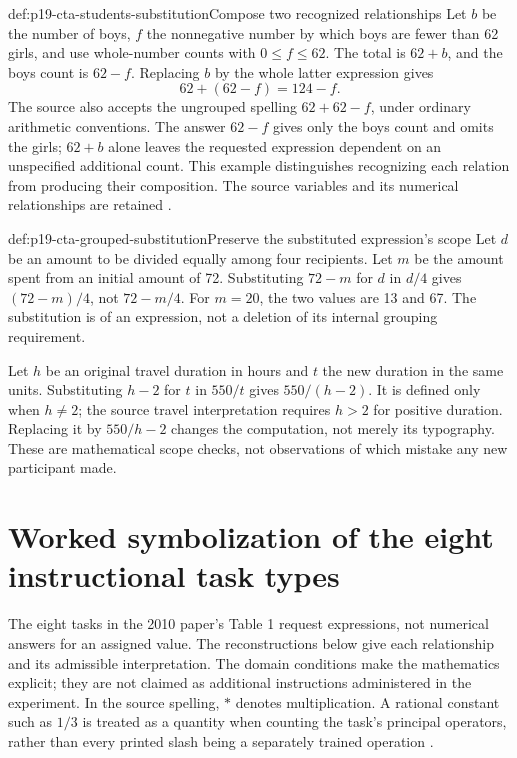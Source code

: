 \begin{hbexample}{def:p19-cta-students-substitution}{Compose two recognized relationships}
Let \(b\) be the number of boys, \(f\) the nonnegative number by
which boys are fewer than 62 girls, and use whole-number counts with
\(0\leq f\leq62\). The total is \(62+b\), and the boys count
is \(62-f\). Replacing \(b\) by the whole latter expression gives
\[
 62+(62-f)=124-f.
\]
The source also accepts the ungrouped spelling \(62+62-f\), under
ordinary arithmetic conventions. The answer \(62-f\) gives only
the boys count and omits the girls; \(62+b\) alone leaves the
requested expression dependent on an unspecified additional count.
This example distinguishes recognizing each relation from producing
their composition. The source variables and its numerical relationships
are retained \cite[pp.~472--473,Tables~1--2]{KoedingerMcLaughlin2010LanguageTransfer}.
\end{hbexample}

\begin{hbexample}{def:p19-cta-grouped-substitution}{Preserve the substituted expression's scope}
Let \(d\) be an amount to be divided equally among four recipients.
Let \(m\) be the amount spent from an initial amount of 72.
Substituting \(72-m\) for \(d\) in \(d/4\) gives
\((72-m)/4\), not \(72-m/4\). For \(m=20\), the two values
are 13 and 67. The substitution is of an expression, not a deletion
of its internal grouping requirement.

Let \(h\) be an original travel duration in hours and \(t\) the
new duration in the same units. Substituting \(h-2\) for \(t\) in \(550/t\)
gives \(550/(h-2)\). It is defined only when \(h\ne2\);
the source travel interpretation requires \(h>2\) for positive
duration. Replacing it by \(550/h-2\) changes the computation,
not merely its typography. These are mathematical scope checks,
not observations of which mistake any new participant made.
\end{hbexample}

\section{Worked symbolization of the eight instructional task types}
\label{sec:p19-cta-worked}

The eight tasks in the 2010 paper's Table 1 request expressions, not
numerical answers for an assigned value. The reconstructions below
give each relationship and its admissible interpretation. The domain
conditions make the mathematics explicit; they are not claimed as
additional instructions administered in the experiment. In the source
spelling, \(*\) denotes multiplication. A rational constant such as
\(1/3\) is treated as a quantity when counting the task's principal
operators, rather than every printed slash being a separately trained
operation \cite[pp.~472--475]{KoedingerMcLaughlin2010LanguageTransfer}.

